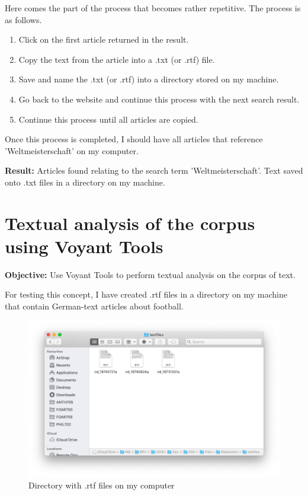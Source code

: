 \documentclass{article}
\begin{document}
Here comes the part of the process that becomes rather repetitive. The process is as follows.

\begin{enumerate}
    \item Click on the first article returned in the result.
    \item Copy the text from the article into a .txt (or .rtf) file.
    \item Save and name the .txt (or .rtf) into a directory stored on my machine.
    \item Go back to the website and continue this process with the next search result.
    \item Continue this process until all articles are copied.
\end{enumerate}

Once this process is completed, I should have all articles that reference 'Weltmeisterschaft' on my computer.

\textbf{Result:} Articles found relating to the search term 'Weltmeisterschaft'. Text saved onto .txt files in a directory on my machine.

\newpage
\section*{Textual analysis of the corpus using Voyant Tools}

\textbf{Objective:} Use Voyant Tools to perform textual analysis on the corpus of text.

For testing this concept, I have created .rtf files in a directory on my machine that contain German-text articles about football.

\begin{figure}[h!]
    \centering
    \includegraphics[width=\textwidth]{textfiles.png}
    \caption{Directory with .rtf files on my computer}
    \label{fig:my_label}
\end{figure}
\end{document}

